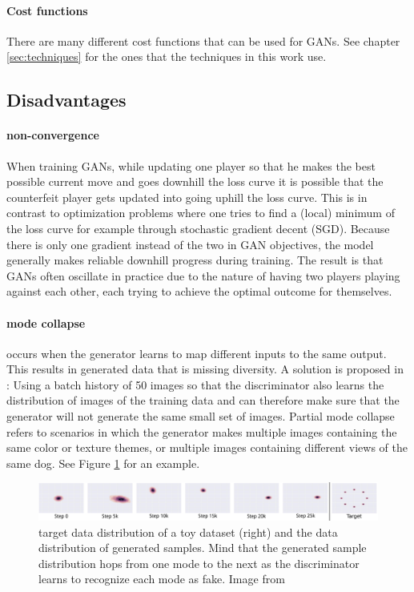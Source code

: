 \paragraph{Cost functions} There are many different cost functions that can be used for GANs. See chapter \ref{sec:techniques} for the ones that the techniques in this work use.


\subsection{Disadvantages}
\paragraph{non-convergence} When training GANs, while updating one player so that he makes the best possible current move and goes downhill the loss curve it is possible that the counterfeit player gets updated into going uphill the loss curve. This is in contrast to optimization problems where one tries to find a (local) minimum of the loss curve for example through stochastic gradient decent (SGD). Because there is only one gradient instead of the two in GAN objectives, the model generally makes reliable downhill progress during training. The result is that GANs often oscillate in practice due to the nature of having two players playing against each other, each trying to achieve the optimal outcome for themselves.

\paragraph{mode collapse} occurs when the generator learns to map different inputs to the same output. This results in generated data that is missing diversity. A solution is proposed in \cite{DBLP:journals/corr/ZhuPIE17}: Using a batch history of 50 images so that the discriminator also learns the distribution of images of the training data and can therefore make sure that the generator will not generate the same small set of images. Partial mode collapse refers to scenarios in which the generator makes multiple images containing the same color or texture themes, or multiple images containing different views of the same dog. See Figure \ref{fig:mode_collapse} for an example.

\begin{figure}
	\centering
	\includegraphics[width=\textwidth]{images/metz_et_al_mode_collapse.png}
	\caption{target data distribution of a toy dataset (right) and the data distribution of generated samples. Mind that the generated sample distribution hops from one mode to the next as the discriminator learns to recognize each mode as fake. Image from \cite{DBLP:journals/corr/MetzPPS16}}
	\label{fig:mode_collapse}
\end{figure}

